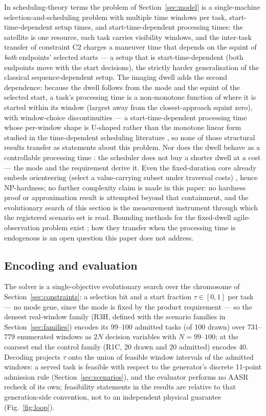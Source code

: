 \documentclass[preprint,authoryear]{elsarticle}
\begin{document}
In scheduling-theory terms the problem of Section~\ref{sec:model} is a single-machine selection-and-scheduling problem with multiple time windows per task, start-time-dependent setup times, and start-time-dependent processing times: the satellite is one resource, each task carries visibility windows, and the inter-task transfer of constraint C2 charges a maneuver time that depends on the squint of \emph{both} endpoints' selected starts --- a setup that is start-time-dependent (both endpoints move with the start decisions), the strictly harder generalisation of the classical sequence-dependent setup. The imaging dwell adds the second dependence: because the dwell follows from the mode and the squint of the selected start, a task's processing time is a non-monotone function of where it is started within its window (largest away from the closest-approach squint zero), with window-choice discontinuities --- a start-time-dependent processing time whose per-window shape is U-shaped rather than the monotone linear form studied in the time-dependent scheduling literature \citep{gawiejnowicz2009equivalent,gawiejnowicz2015structural,he2019time}, so none of those structural results transfer as statements about this problem. Nor does the dwell behave as a controllable processing time \citep{shabtay2007survey}: the scheduler does not buy a shorter dwell at a cost --- the mode and the requirement derive it. Even the fixed-duration core already embeds orienteering (select a value-carrying subset under traversal costs) \citep{peng2019agile}, hence NP-hardness; no further complexity claim is made in this paper: no hardness proof or approximation result is attempted beyond that containment, and the evolutionary search of this section is the measurement instrument through which the registered scenario set is read. Bounding methods for the fixed-dwell agile-observation problem exist \citep{habet2010bounding}; how they transfer when the processing time is endogenous is an open question this paper does not address.

\subsection{Encoding and evaluation}

The solver is a single-objective evolutionary search over the chromosome of Section~\ref{sec:constraints}: a selection bit and a start fraction $\tau\in[0,1]$ per task --- no mode gene, since the mode is fixed by the product requirement --- so the densest real-window family (R3H, defined with the scenario families in Section~\ref{sec:families}) encodes its 99--100 admitted tasks (of 100 drawn) over 731--779 enumerated windows as $2N$ decision variables with $N=99$--$100$; at the coarsest end the control family (R1C, 20 drawn and 20 admitted) encodes 40. Decoding projects $\tau$ onto the union of feasible window intervals of the admitted windows: a served task is feasible with respect to the generator's discrete 11-point admission rule (Section~\ref{sec:scenarios}), and the evaluator performs no AASR recheck of its own; feasibility statements in the results are relative to that generation-side convention, not to an independent physical guarantee (Fig.~\ref{fig:loop}).
\end{document}

